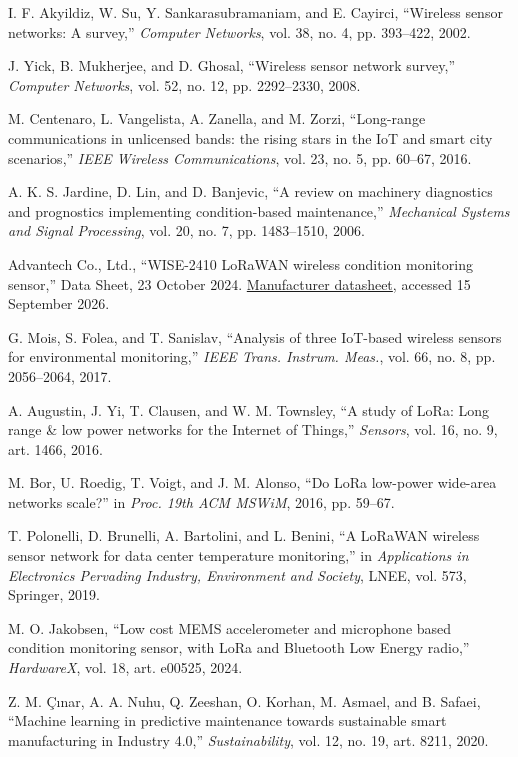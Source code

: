 \documentclass[11pt, letterpaper]{article}
\begin{document}
\begin{enumerate}[label={[\arabic*]}, noitemsep]
\item I. F. Akyildiz, W. Su, Y. Sankarasubramaniam, and E. Cayirci, ``Wireless sensor networks: A survey,'' \textit{Computer Networks}, vol. 38, no. 4, pp. 393--422, 2002.
\item J. Yick, B. Mukherjee, and D. Ghosal, ``Wireless sensor network survey,'' \textit{Computer Networks}, vol. 52, no. 12, pp. 2292--2330, 2008.
\item M. Centenaro, L. Vangelista, A. Zanella, and M. Zorzi, ``Long-range communications in unlicensed bands: the rising stars in the IoT and smart city scenarios,'' \textit{IEEE Wireless Communications}, vol. 23, no. 5, pp. 60--67, 2016.
\item A. K. S. Jardine, D. Lin, and D. Banjevic, ``A review on machinery diagnostics and prognostics implementing condition-based maintenance,'' \textit{Mechanical Systems and Signal Processing}, vol. 20, no. 7, pp. 1483--1510, 2006.
\item Advantech Co., Ltd., ``WISE-2410 LoRaWAN wireless condition monitoring sensor,'' Data Sheet, 23 October 2024. \href{https://advdownload.advantech.com/productfile/PIS/WISE-2410/file/WISE-2410_DS\%28102324\%2920241023133301.pdf}{Manufacturer datasheet}, accessed 15 September 2026.
\item G. Mois, S. Folea, and T. Sanislav, ``Analysis of three IoT-based wireless sensors for environmental monitoring,'' \textit{IEEE Trans. Instrum. Meas.}, vol. 66, no. 8, pp. 2056--2064, 2017.
\item A. Augustin, J. Yi, T. Clausen, and W. M. Townsley, ``A study of LoRa: Long range \& low power networks for the Internet of Things,'' \textit{Sensors}, vol. 16, no. 9, art. 1466, 2016.
\item M. Bor, U. Roedig, T. Voigt, and J. M. Alonso, ``Do LoRa low-power wide-area networks scale?'' in \textit{Proc. 19th ACM MSWiM}, 2016, pp. 59--67.
\item T. Polonelli, D. Brunelli, A. Bartolini, and L. Benini, ``A LoRaWAN wireless sensor network for data center temperature monitoring,'' in \textit{Applications in Electronics Pervading Industry, Environment and Society}, LNEE, vol. 573, Springer, 2019.
\item M. O. Jakobsen, ``Low cost MEMS accelerometer and microphone based condition monitoring sensor, with LoRa and Bluetooth Low Energy radio,'' \textit{HardwareX}, vol. 18, art. e00525, 2024.
\item Z. M. Çınar, A. A. Nuhu, Q. Zeeshan, O. Korhan, M. Asmael, and B. Safaei, ``Machine learning in predictive maintenance towards sustainable smart manufacturing in Industry 4.0,'' \textit{Sustainability}, vol. 12, no. 19, art. 8211, 2020.

\end{enumerate}
\end{document}
